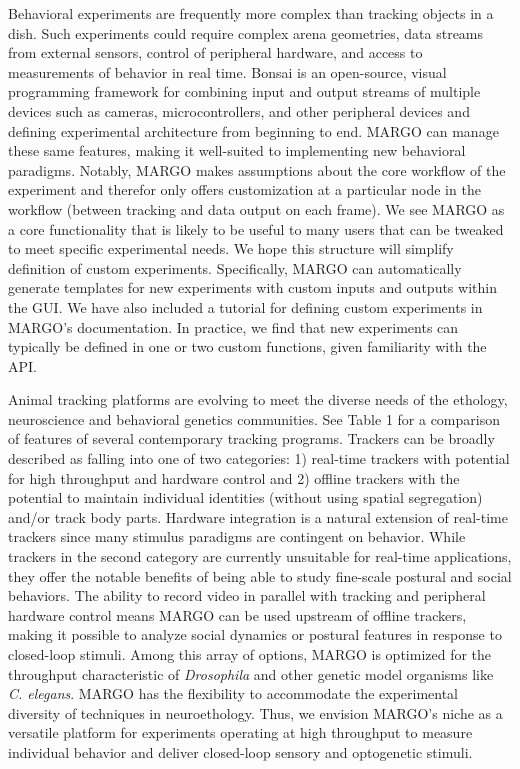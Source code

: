 \documentclass[10pt,letterpaper]{article}
\begin{document}
Behavioral experiments are frequently more complex than tracking objects in a dish. Such experiments could require complex arena geometries, data streams from external sensors, control of peripheral hardware, and access to measurements of behavior in real time. Bonsai is an open-source, visual programming framework for combining input and output streams of multiple devices such as cameras, microcontrollers, and other peripheral devices and defining experimental architecture from beginning to end. MARGO can manage these same features, making it well-suited to implementing new behavioral paradigms. Notably, MARGO makes assumptions about the core workflow of the experiment and therefor only offers customization at a particular node in the workflow (between tracking and data output on each frame). We see MARGO as a core functionality that is likely to be useful to many users that can be tweaked to meet specific experimental needs. We hope this structure will simplify definition of custom experiments. Specifically, MARGO can automatically generate templates for new experiments with custom inputs and outputs within the GUI. We have also included a tutorial for defining custom experiments in MARGO's documentation. In practice, we find that new experiments can typically be defined in one or two custom functions, given familiarity with the API.

Animal tracking platforms are evolving to meet the diverse needs of the ethology, neuroscience and behavioral genetics communities. See Table 1 for a comparison of features of several contemporary tracking programs. Trackers can be broadly described as falling into one of two categories: 1) real-time trackers \cite{Fry_TrackFly_2008,Straw_Multi_2010,Chagas_The_2017,Geissmann_Ethoscopes_2017,Mnck_BioTracker_2018,Scaplen_Automated_2019} with potential for high throughput and hardware control and 2) offline trackers \cite{Branson_High_2009,Prez-Escudero_idTracker_2014,Eyjolfsdottir_Detecting_2014,Rodriguez_ToxId_2017,Sridhar_2019,romero-ferrero_2019} with the potential to maintain individual identities (without using spatial segregation) and/or track body parts. Hardware integration is a natural extension of real-time trackers since many stimulus paradigms are contingent on behavior. While trackers in the second category are currently unsuitable for real-time applications, they offer the notable benefits of being able to study fine-scale postural and social behaviors. The ability to record video in parallel with tracking and peripheral hardware control means MARGO can be used upstream of offline trackers, making it possible to analyze social dynamics or postural features in response to closed-loop stimuli. Among this array of options, MARGO is optimized for the throughput characteristic of \textit{Drosophila} and other genetic model organisms like \textit{C. elegans}. MARGO has the flexibility to accommodate the experimental diversity of techniques in neuroethology. Thus, we envision MARGO's niche as a versatile platform for experiments operating at high throughput to measure individual behavior and deliver closed-loop sensory and optogenetic stimuli. 
\end{document}
